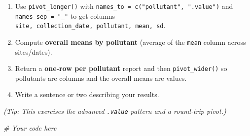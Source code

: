 \documentclass[
  11pt,
]{article}
\newenvironment{Shaded}{\begin{snugshade}}{\end{snugshade}}
\newcommand{\CommentTok}[1]{\textcolor[rgb]{0.56,0.35,0.01}{\textit{#1}}}
\begin{document}
\begin{enumerate}
\def\labelenumi{\arabic{enumi}.}
\setcounter{enumi}{1}
\item
  Use \texttt{pivot\_longer()} with
  \texttt{names\_to\ =\ c("pollutant",\ ".value")} and
  \texttt{names\_sep\ =\ "\_"} to get columns
  \texttt{site,\ collection\_date,\ pollutant,\ mean,\ sd}.
\item
  Compute \textbf{overall means by pollutant} (average of the
  \texttt{mean} column across sites/dates).
\item
  Return a \textbf{one‑row per pollutant} report and then
  \texttt{pivot\_wider()} so pollutants are columns and the overall
  means are values.
\item
  Write a sentence or two describing your results.
\end{enumerate}

\emph{(Tip: This exercises the advanced \texttt{.value} pattern and a
round‑trip pivot.)}

\begin{Shaded}
\begin{Highlighting}[]
\CommentTok{\# Your code here}
\end{Highlighting}
\end{Shaded}



\end{document}
